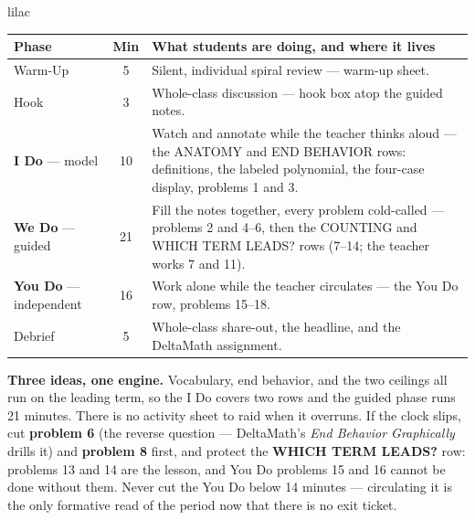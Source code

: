 \documentclass[10pt]{article}
\begin{document}
\boxguard[22]
\begin{skillbox}{lilac}
\small
\renewcommand{\arraystretch}{1.25}
\begin{tabularx}{\linewidth}{@{} l c X @{}}
\textbf{Phase} & \textbf{Min} & \textbf{What students are doing, and where it lives} \\
\midrule
Warm-Up                       & 5  & Silent, individual spiral review --- warm-up sheet. \\
Hook                          & 3  & Whole-class discussion --- hook box atop the guided notes. \\
\textbf{I Do} --- model       & 10 & Watch and annotate while the teacher thinks aloud --- the ANATOMY and END BEHAVIOR rows: definitions, the labeled polynomial, the four-case display, problems 1 and 3. \\
\textbf{We Do} --- guided     & 21 & Fill the notes together, every problem cold-called --- problems 2 and 4--6, then the COUNTING and WHICH TERM LEADS? rows (7--14; the teacher works 7 and 11). \\
\textbf{You Do} --- independent & 16 & Work alone while the teacher circulates --- the You Do row, problems 15--18. \\
Debrief                       & 5  & Whole-class share-out, the headline, and the DeltaMath assignment. \\
\end{tabularx}

\smallskip
\textbf{Three ideas, one engine.} Vocabulary, end behavior, and the two ceilings all run on the
leading term, so the I Do covers two rows and the guided phase runs 21 minutes. There is no
activity sheet to raid when it overruns. If the clock slips, cut \textbf{problem 6} (the
reverse question --- DeltaMath's \textit{End Behavior Graphically} drills it) and
\textbf{problem 8} first, and protect the \textbf{WHICH TERM LEADS?} row: problems 13 and 14
are the lesson, and You Do problems 15 and 16 cannot be done without them. Never cut the You
Do below 14 minutes --- circulating it is the only formative read of the period now that there
is no exit ticket.
\end{skillbox}
\end{document}
